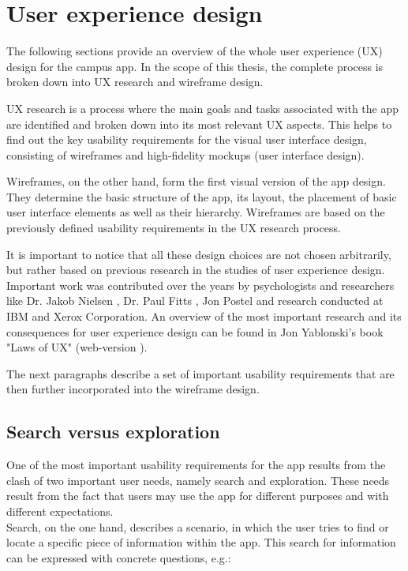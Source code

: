 \section{User experience design}
The following sections provide an overview of the whole user experience (UX) design for the campus app. In the scope of this thesis, the complete process is broken down into UX research and wireframe design.

UX research is a process where the main goals and tasks associated with the app are identified and broken down into its most relevant UX aspects. This helps to find out the key usability requirements for the visual user interface design, consisting of wireframes and high-fidelity mockups (user interface design).

Wireframes, on the other hand, form the first visual version of the app design. They determine the basic structure of the app, its layout, the placement of basic user interface elements as well as their hierarchy. Wireframes are based on the previously defined usability requirements in the UX research process.

It is important to notice that all these design choices are not chosen arbitrarily, but rather based on previous research in the studies of user experience design. Important work was contributed over the years by psychologists and researchers like Dr. Jakob Nielsen \cite{jakob_nielsen}, Dr. Paul Fitts \cite{paul_fitts}, Jon Postel and research conducted at IBM and Xerox Corporation. An overview of the most important research and its consequences for user experience design can be found in Jon Yablonski's book "Laws of UX" \cite{yablonski2020laws} (web-version \cite{yablonski_web}).

The next paragraphs describe a set of important usability requirements that are then further incorporated into the wireframe design.

\subsection{Search versus exploration}
One of the most important usability requirements for the app results from the clash of two important user needs, namely search and exploration. These needs result from the fact that users may use the app for different purposes and with different expectations.\\

Search, on the one hand, describes a scenario, in which the user tries to find or locate a specific piece of information within the app. This search for information can be expressed with concrete questions, e.g.:

